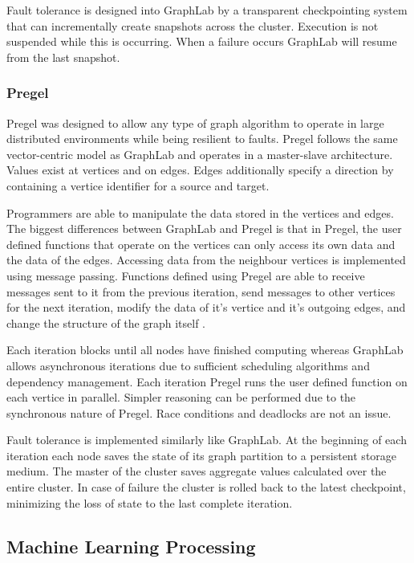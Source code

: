 \documentclass[12pt]{article}
\begin{document}
Fault tolerance is designed into GraphLab by a transparent checkpointing system that can incrementally create snapshots across the cluster. Execution is not suspended while this is occurring. When a failure occurs GraphLab will resume from the last snapshot.



\subsubsection{Pregel}

Pregel \cite{malewicz2010pregel} was designed to allow any type of graph algorithm to operate in large distributed environments while being resilient to faults. Pregel follows the same vector-centric model as GraphLab and operates in a master-slave architecture. Values exist at vertices and on edges. Edges additionally specify a direction by containing a vertice identifier for a source and target.

Programmers are able to manipulate the data stored in the vertices and edges. The biggest differences between GraphLab and Pregel is that in Pregel, the user defined functions that operate on the vertices can only access its own data and the data of the edges. Accessing data from the neighbour vertices is implemented using message passing. Functions defined using Pregel are able to receive messages sent to it from the previous iteration, send messages to other vertices for the next iteration, modify the data of it's vertice and it's outgoing edges, and change the structure of the graph itself \cite{zhang2016survey}.

Each iteration blocks until all nodes have finished computing whereas GraphLab allows asynchronous iterations due to sufficient scheduling algorithms and dependency management. Each iteration Pregel runs the user defined function on each vertice in parallel. Simpler reasoning can be performed due to the synchronous nature of Pregel. Race conditions and deadlocks are not an issue.

Fault tolerance is implemented similarly like GraphLab. At the beginning of each iteration each node saves the state of its graph partition to a persistent storage medium. The master of the cluster saves aggregate values calculated over the entire cluster. In case of failure the cluster is rolled back to the latest checkpoint, minimizing the loss of state to the last complete iteration.


\subsection{Machine Learning Processing}
\end{document}
